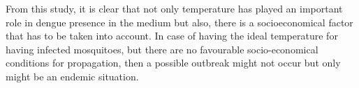 \noindent From this study, it is clear that not only temperature has played an important role in dengue presence in the medium but also, there is a socioeconomical factor that has to be taken into account. In case of having the ideal temperature for having infected mosquitoes, but there are no favourable socio-economical conditions for propagation, then a possible outbreak might not occur but only might be an endemic situation.


